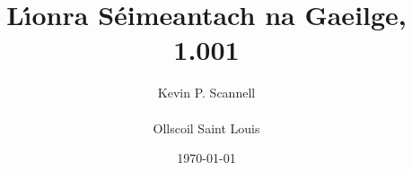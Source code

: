 \documentclass[8pt,twocolumn,openany]{extbook}
\begin{document}
\begin{frontmatter}
\title{\Huge\bf L\'{\i}onra S\'eimeantach na Gaeilge,
1.001} %
\author{{\Large Kevin P. Scannell}\\ \\ {\Large Ollscoil Saint Louis}}
\date{\today}
\maketitle
\onecolumn

\end{frontmatter}

\begin{mainmatter}
\twocolumn
\lhead{\large\bf \rightmark}
\rhead{\large\bf \leftmark}

\appendix
\lhead{}
\rhead{}

\end{mainmatter}

\begin{backmatter}
\onecolumn


%

\end{backmatter}
\end{document}
